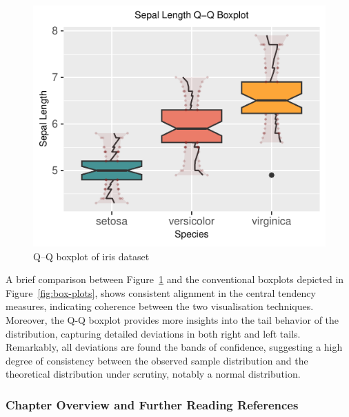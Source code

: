\documentclass{article}\usepackage[]{graphicx}\usepackage[]{xcolor}
\makeatletter
\def\maxwidth{ %
  \ifdim\Gin@nat@width>\linewidth
    \linewidth
  \else
    \Gin@nat@width
  \fi
}
\newenvironment{knitrout}{}{} %
\numberwithin{equation}{section}
\makeatother
\begin{document}
\begin{knitrout}\scriptsize
{}\color{fgcolor}\begin{figure}[h]

{\centering \includegraphics[width=\maxwidth]{figure/beamer-QQboxplots-1} 

}

\caption[Q–Q boxplot of iris dataset]{Q–Q boxplot of iris dataset}\label{fig:QQboxplots}
\end{figure}

\end{knitrout}


\noindent
A brief comparison between Figure~\ref{fig:QQboxplots} and the conventional boxplots depicted in Figure~\ref{fig:box-plots}, shows consistent alignment in the central tendency measures, indicating coherence between the two visualisation techniques.\\

\noindent 
Moreover, the Q-Q boxplot provides more insights into the tail behavior of the distribution, capturing detailed deviations in both right and left tails. Remarkably, all deviations are found the bands of confidence, suggesting a high degree of consistency between the observed sample distribution and the theoretical distribution under scrutiny, notably a normal distribution. 

\subsubsection*{Chapter Overview and Further Reading References}
\end{document}
